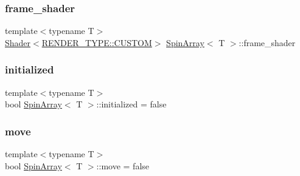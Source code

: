\mbox{\label{classSpinArray_a38b047bbf2238e86980eff7836ebb295}} 
\subsubsection{\texorpdfstring{frame\+\_\+shader}{frame\_shader}}
{\footnotesize\ttfamily template$<$typename T$>$ \\
\mbox{\hyperlink{classShader}{Shader}}$<$\mbox{\hyperlink{shader__class_8hpp_a24e288e18eb7b6e01de7565001fedb60a72baef04098f035e8a320b03ad197818}{R\+E\+N\+D\+E\+R\+\_\+\+T\+Y\+P\+E\+::\+C\+U\+S\+T\+OM}}$>$ \mbox{\hyperlink{classSpinArray}{Spin\+Array}}$<$ T $>$\+::frame\+\_\+shader\hspace{0.3cm}{\ttfamily [private]}}

\mbox{\label{classSpinArray_a1f55995a2d688afe24b401808c1b89ae}} 
\subsubsection{\texorpdfstring{initialized}{initialized}}
{\footnotesize\ttfamily template$<$typename T$>$ \\
bool \mbox{\hyperlink{classSpinArray}{Spin\+Array}}$<$ T $>$\+::initialized = false\hspace{0.3cm}{\ttfamily [private]}}

\mbox{\label{classSpinArray_a59fb1e92a58e498f10e370ac5ea29174}} 
\subsubsection{\texorpdfstring{move}{move}}
{\footnotesize\ttfamily template$<$typename T$>$ \\
bool \mbox{\hyperlink{classSpinArray}{Spin\+Array}}$<$ T $>$\+::move = false\hspace{0.3cm}{\ttfamily [private]}}

\mbox{\label{classSpinArray_ae9052b9d2725a355e185a2fc56b138d5}} 
